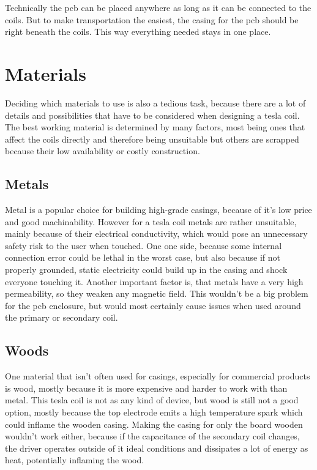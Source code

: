 Technically the \gls{pcb} can be placed anywhere as long as it can be connected to the coils. But to make transportation the easiest, the casing for the \gls{pcb} should be right beneath the coils. This way everything needed stays in one place. 

\section{Materials}

Deciding which materials to use is also a tedious task, because there are a lot of details and possibilities that have to be considered when designing a tesla coil. The best working material is determined by many factors, most being ones that affect the coils directly and therefore being unsuitable but others are scrapped because their low availability or costly construction.

\subsection{Metals}
\label{subsec:materials-metals}

Metal is a popular choice for building high-grade casings, because of it's low price and good machinability. However for a tesla coil metals are rather unsuitable, mainly because of their electrical conductivity, which would pose an unnecessary safety risk to the user when touched. One one side, because some internal connection error could be lethal in the worst case, but also because if not properly grounded, static electricity could build up in the casing and shock everyone touching it. Another important factor is, that metals have a very high permeability, so they weaken any magnetic field. This wouldn't be a big problem for the \gls{pcb} enclosure, but would most certainly cause issues when used around the primary or secondary coil.

\subsection{Woods}

One material that isn't often used for casings, especially for commercial products is wood, mostly because it is more expensive and harder to work with than metal. This tesla coil is not as any kind of device, but wood is still not a good option, mostly because the top electrode emits a high temperature spark which could inflame the wooden casing. Making the casing for only the board wooden wouldn't work either, because if the capacitance of the secondary coil changes, the driver operates outside of it ideal conditions and dissipates a lot of energy as heat, potentially inflaming the wood.

